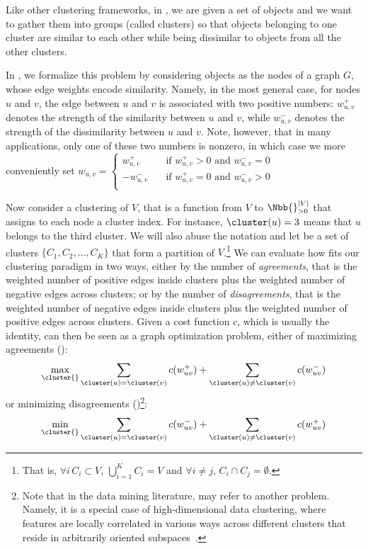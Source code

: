 Like other clustering frameworks, in \pcc{}, we are given a set of objects and we want to gather
them into groups (called clusters) so that objects belonging to one cluster are similar to each
other while being dissimilar to objects from all the other clusters.

In \pcc{}, we formalize this problem by considering objects as the nodes of a graph $G$, whose edge
weights encode similarity. Namely, in the most general case, for nodes $u$ and $v$, the edge between
$u$ and $v$ is associated with two positive numbers:
$w_{u,v}^+$ denotes the strength of the similarity between $u$ and $v$, while
$w_{u,v}^-$ denotes the strength of the dissimilarity between $u$ and $v$.
Note, however, that in many applications, only one of these two numbers is nonzero, in which case
we more conveniently set $w_{u,v} = \begin{cases}
	 w_{u,v}^+ & \quad \text{if } w_{u,v}^+ > 0 \text{ and } w_{u,v}^-=0 \\
	-w_{u,v}^- & \quad \text{if } w_{u,v}^+ = 0 \text{ and } w_{u,v}^->0 \\
\end{cases}$


Now consider a clustering \cluster{} of $V$, that is a function from $V$ to $\Nbb{}^{|V|}_{>0}$ that
assigns to each node a cluster index. For instance, $\cluster(u) = 3$ means that $u$ belongs to the
third cluster. We will also abuse the notation and let \cluster{} be a set of clusters $\{C_1, C_2,
\ldots, C_K\}$ that form a partition of $V$.\footnote{That is, $\forall i\,C_i\subset V$,
$\bigcup_{i=1}^K C_i = V$ and $\forall i\neq j,\, C_i\cap C_j = \emptyset$.}
We can evaluate how \cluster{} fits our clustering paradigm in two ways,
either by the number of \emph{agreements}, that is the weighted number of positive edges inside
clusters plus the weighted number of negative edges across clusters; or by the number of
\emph{disagreements}, that is the weighted number of negative edges inside clusters plus the
weighted number of positive edges across clusters. Given a cost function $c$, which is usually the
identity, \pcc{} can then be seen as a graph optimization problem, either of maximizing agreements
(\maxa{}):
\begin{equation}
	\max_{\cluster{}} \sum_{\cluster(u) = \cluster(v)} c(w_{uv}^+) +
	\sum_{\cluster(u) \neq \cluster(v)} c(w_{uv}^-)
	\label{eq:maxa}
\end{equation}
or minimizing disagreements (\mind{})\footnote{Note that in the data mining literature, \pcc{} may
refer to another problem. Namely, it is a special case of high-dimensional data clustering, where
features are locally correlated in various ways across different clusters that reside in arbitrarily
oriented subspaces~\autocite{otherCCproblem09}.}:
\begin{equation}
	\min_{\cluster{}} \sum_{\cluster(u) = \cluster(v)} c(w_{uv}^-) +
	\sum_{\cluster(u) \neq \cluster(v)} c(w_{uv}^+)
	\label{eq:mind}
\end{equation}

